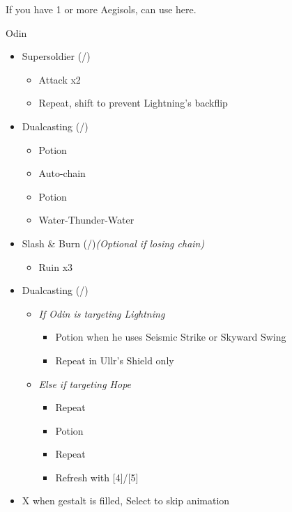 \renewcommand{\first}{[1] Slash \& Burn (\com/\rav)}
\renewcommand{\second}{[2] Supersoldier (\com/\syn)}
\renewcommand{\fourth}{[4] Dualcasting (\rav/\rav)}
\renewcommand{\fifth}{[5] Dualcasting (\rav/\rav)}
If you have 1 or more Aegisols, can use here.
\begin{battle}{Odin}
\begin{multicols}{2}
\begin{itemize}
    \item \second
    \begin{itemize}
        \item Attack x2
        \item Repeat, shift to prevent Lightning's backflip
    \end{itemize}
    \item \fourth
    \begin{itemize}
        \item Potion
        \item Auto-chain
        \item Potion
        \item Water-Thunder-Water
    \end{itemize}
	\item \first \textit{(Optional if losing chain)}
	\begin{itemize}
		\item Ruin x3
	\end{itemize}
    \columnbreak
    \item \fifth
    \begin{itemize}
        \item \textit{If Odin is targeting Lightning}
        \begin{itemize}
            \item Potion when he uses Seismic Strike or Skyward Swing
            \item Repeat in Ullr's Shield only
        \end{itemize}
        \item \textit{Else if targeting Hope}
        \begin{itemize}
            \item Repeat
            \item Potion
            \item Repeat
            \item Refresh with [4]/[5]
        \end{itemize}
    \end{itemize}
    \item X when gestalt is filled, Select to skip animation
\end{itemize}
\end{multicols}
\end{battle}
